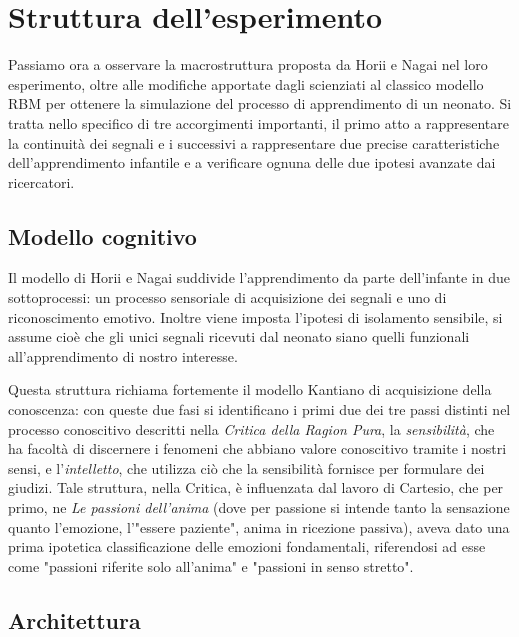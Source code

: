 \documentclass[10pt,letterpaper]{article}
\begin{document}
\newpage
\section{Struttura dell'esperimento}

Passiamo ora a osservare la macrostruttura proposta da Horii e Nagai nel loro esperimento, oltre alle modifiche apportate dagli scienziati al classico modello RBM per ottenere la simulazione del processo di apprendimento di un neonato. Si tratta nello specifico di tre accorgimenti importanti, il primo atto a rappresentare la continuità dei segnali e i successivi a rappresentare due precise caratteristiche dell'apprendimento infantile e a verificare ognuna delle due ipotesi avanzate dai ricercatori.

\subsection{Modello cognitivo}

Il modello di Horii e Nagai suddivide l'apprendimento da parte dell'infante in due sottoprocessi: un processo sensoriale di acquisizione dei segnali e uno di riconoscimento emotivo. Inoltre viene imposta l'ipotesi di isolamento sensibile, si assume cioè che gli unici segnali ricevuti dal neonato siano quelli funzionali all'apprendimento di nostro interesse.

Questa struttura richiama fortemente il modello Kantiano di acquisizione della conoscenza: con queste due fasi si identificano i primi due dei tre passi distinti nel processo conoscitivo descritti nella \textit{Critica della Ragion Pura}, la \textit{sensibilità}, che ha facoltà di discernere i fenomeni che abbiano valore conoscitivo tramite i nostri sensi, e l'\textit{intelletto}, che utilizza ciò che la sensibilità fornisce per formulare dei giudizi. Tale struttura, nella Critica, è influenzata dal lavoro di Cartesio, che per primo, ne \textit{Le passioni dell'anima} (dove per passione si intende tanto la sensazione quanto l'emozione, l'"essere paziente", anima in ricezione passiva), aveva dato una prima ipotetica classificazione delle emozioni fondamentali, riferendosi ad esse come "passioni riferite solo all'anima" e "passioni in senso stretto".

\subsection{Architettura}
\end{document}
